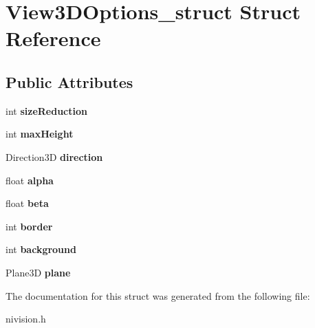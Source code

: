 \hypertarget{structView3DOptions__struct}{\section{\-View3\-D\-Options\-\_\-struct \-Struct \-Reference}
\label{structView3DOptions__struct}
}
\subsection*{\-Public \-Attributes}
\begin{DoxyCompactItemize}
\item 
\hypertarget{structView3DOptions__struct_a23dc08fec5e9591a5d9bf39f26fd1cfb}{int {\bfseries size\-Reduction}}\label{structView3DOptions__struct_a23dc08fec5e9591a5d9bf39f26fd1cfb}

\item 
\hypertarget{structView3DOptions__struct_a4fa1b51912be7069faf5ec0db0286e0c}{int {\bfseries max\-Height}}\label{structView3DOptions__struct_a4fa1b51912be7069faf5ec0db0286e0c}

\item 
\hypertarget{structView3DOptions__struct_abff4464b5ae5963f0a581e6d0ea9e9e8}{\-Direction3\-D {\bfseries direction}}\label{structView3DOptions__struct_abff4464b5ae5963f0a581e6d0ea9e9e8}

\item 
\hypertarget{structView3DOptions__struct_a00dbe0b5c9142ef96fe1d3c1902ccfd8}{float {\bfseries alpha}}\label{structView3DOptions__struct_a00dbe0b5c9142ef96fe1d3c1902ccfd8}

\item 
\hypertarget{structView3DOptions__struct_a947480d0d227b7ce32a84fcef1ab0de1}{float {\bfseries beta}}\label{structView3DOptions__struct_a947480d0d227b7ce32a84fcef1ab0de1}

\item 
\hypertarget{structView3DOptions__struct_a4dbbf9ce33b166db5a0b741a7cf67325}{int {\bfseries border}}\label{structView3DOptions__struct_a4dbbf9ce33b166db5a0b741a7cf67325}

\item 
\hypertarget{structView3DOptions__struct_af667dbc054915bac707d2e5a51b32a7e}{int {\bfseries background}}\label{structView3DOptions__struct_af667dbc054915bac707d2e5a51b32a7e}

\item 
\hypertarget{structView3DOptions__struct_a0ca78546e6f56abe9ab5ec2425cb73aa}{\-Plane3\-D {\bfseries plane}}\label{structView3DOptions__struct_a0ca78546e6f56abe9ab5ec2425cb73aa}

\end{DoxyCompactItemize}


\-The documentation for this struct was generated from the following file\-:\begin{DoxyCompactItemize}
\item 
nivision.\-h\end{DoxyCompactItemize}
